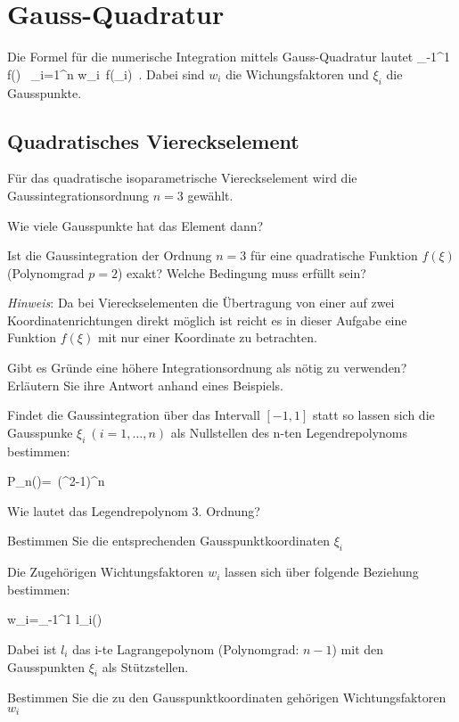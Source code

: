 \clearpage
\setcounter{page}{1}

\section{Gauss-Quadratur}

Die Formel für die numerische Integration mittels Gauss-Quadratur lautet
\eb
\int_{-1}^1 f(\xi)\  \xi \approx
\sum_{i=1}^n w_i\ f(\xi_i)\ .
\ee
Dabei sind $w_i$ die Wichungsfaktoren und $\xi_i$ die Gausspunkte.


\subsection{Quadratisches Viereckselement}

Für das quadratische isoparametrische Viereckselement wird die Gaussintegrationsordnung $n=3$ gewählt.

\enab
\item Wie viele Gausspunkte hat das Element dann? 
\item Ist die Gaussintegration der Ordnung $n=3$ für eine quadratische Funktion $f(\xi)$ (Polynomgrad $p=2$) exakt? 
      Welche Bedingung muss erfüllt sein?
          
      \textit{Hinweis}: Da bei Viereckselementen die Übertragung von einer auf zwei Koordinatenrichtungen direkt möglich ist reicht es in dieser Aufgabe eine Funktion $f(\xi)$ mit nur einer Koordinate zu betrachten.
\enae




\enabres
\item Gibt es Gründe eine höhere Integrationsordnung als nötig zu verwenden? Erläutern Sie ihre Antwort anhand eines Beispiels.
\enae

Findet die Gaussintegration über das Intervall $[-1,1]$ statt so lassen sich die Gausspunke $\xi_i\ (i=1,\hdots,n)$ als Nullstellen des n-ten Legendrepolynoms bestimmen:

\eb
P_n(\xi)=\ (\xi^2-1)^n
\ee

\enabres
\item Wie lautet das Legendrepolynom 3. Ordnung?
\item Bestimmen Sie die entsprechenden Gausspunktkoordinaten $\xi_i$
\enae

Die Zugehörigen Wichtungsfaktoren $w_i$ lassen sich über folgende Beziehung bestimmen:

\eb
w_i=\int_{-1}^1 l_i(\xi)\ \xi
\ee

Dabei ist $l_i$ das i-te Lagrangepolynom (Polynomgrad: $n-1$) mit den Gausspunkten $\xi_i$ als Stützstellen.

\enabres
\item Bestimmen Sie die zu den Gausspunktkoordinaten gehörigen Wichtungsfaktoren $w_i$
\enae

\clearpage



